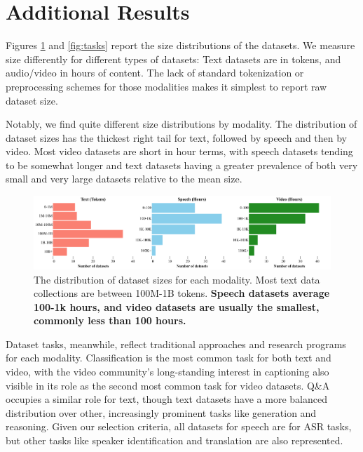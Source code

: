 \section{Additional Results}
\label{app:results}
Figures \ref{fig:dimensions} and \ref{fig:tasks} report the size distributions of the datasets. We measure size differently for different types of datasets: Text datasets are in tokens, and audio/video in hours of content. The lack of standard tokenization or preprocessing schemes for those modalities makes it simplest to report raw dataset size.

Notably, we find quite different size distributions by modality. The distribution of dataset sizes has the thickest right tail for text, followed by speech and then by video. Most video datasets are short in hour terms, with speech datasets tending to be somewhat longer and text datasets having a greater prevalence of both very small and very large datasets relative to the mean size.

\begin{figure}[!htb]
    \centering
    \includegraphics[width=\textwidth]{figures/dimensions.pdf}
    \caption{The distribution of dataset sizes for each modality. Most text data collections are between 100M-1B tokens. \textbf{Speech datasets average 100-1k hours, and video datasets are usually the smallest, commonly less than 100 hours.} }
    \label{fig:dimensions}
\end{figure}

Dataset tasks, meanwhile, reflect traditional approaches and research programs for each modality. Classification is the most common task for both text and video, with the video community's long-standing interest in captioning also visible in its role as the second most common task for video datasets. Q\&A occupies a similar role for text, though text datasets have a more balanced distribution over other, increasingly prominent tasks like generation and reasoning. Given our selection criteria, all datasets for speech are for ASR tasks, but other tasks like speaker identification and translation are also represented.

